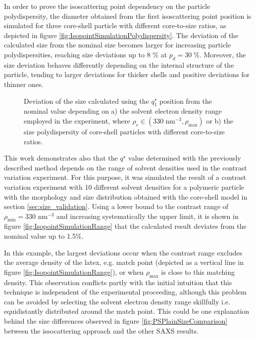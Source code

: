 In order to prove the isoscattering point dependency on the particle polydispersity, the diameter obtained from the first isoscattering point position is simulated for three core-shell particle with different core-to-size ratios, as depicted in figure \ref{fig:IsopointSimulationPolydispersity}. The deviation of the calculated size from the nominal size becomes larger for increasing particle polydispersities, reaching size deviations up to 8 $\%$ at $p_d = 30\;\%$. Moreover, the size deviation behaves differently depending on the internal structure of the particle, tending to larger deviations for thicker shells and positive deviations for thinner ones.

\begin{figure}%
	\centering
	\caption{Deviation of the size calculated using the $q_1^{\star}$ position from the nominal value depending on a) the solvent electron density range employed in the experiment, where  $\rho_e \in (330\;\mbox{nm}^{-3}, \rho_{\text{max}})$ or b) the size polydispersity of core-shell particles with different core-to-size ratios.}

\end{figure}

This work demonstrates also that the $q^{\star}$ value determined with the previously described method depends on the range of solvent densities used in the contrast variation experiment. For this purpose, it was simulated the result of a contrast variation experiment with 10 different solvent densities for a polymeric particle with the morphology and size distribution obtained with the core-shell model in section \ref{sec:size_validation}. Using a lower bound to the contrast range of $\rho_{\text{min}}=330$ nm$^{-3}$ and increasing systematically the upper limit, it is shown in figure \ref{fig:IsopointSimulationRange} that the calculated result deviates from the nominal value up to 1.5$\%$. 

In this example, the largest deviations occur when the contrast range excludes the average density of the latex, e.g. match point (depicted as a vertical line in figure \ref{fig:IsopointSimulationRange}), or when $\rho_{\text{max}}$ is close to this matching density. This observation conflicts partly with the initial intuition that this technique is independent of the experimental proceeding, although this problem can be avoided by selecting the solvent electron density range skillfully i.e. equidistantly distributed around the match point. This could be one explanation behind the size differences observed in figure \ref{fig:PSPlainSizeComparison} between the issocattering approach and the other SAXS results.


